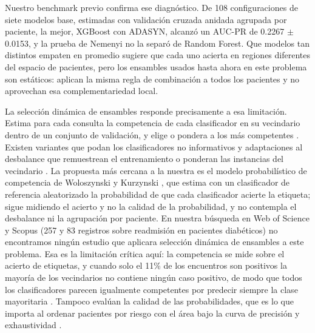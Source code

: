 \documentclass[pdflatex,sn-mathphys-num]{sn-jnl}
\begin{document}
Nuestro benchmark previo confirma ese diagnóstico. De 108 configuraciones de siete modelos base, estimadas con validación cruzada anidada agrupada por paciente, la mejor, XGBoost \cite{bib_chen} con ADASYN, alcanzó un AUC-PR de 0.2267 $\pm$ 0.0153, y la prueba de Nemenyi \cite{bib_demsar} no la separó de Random Forest. Que modelos tan distintos empaten en promedio sugiere que cada uno acierta en regiones diferentes del espacio de pacientes, pero los ensambles usados hasta ahora en este problema son estáticos: aplican la misma regla de combinación a todos los pacientes y no aprovechan esa complementariedad local.

La selección dinámica de ensambles responde precisamente a esa limitación. Estima para cada consulta la competencia de cada clasificador en su vecindario dentro de un conjunto de validación, y elige o pondera a los más competentes \cite{bib_woods_1997, bib_ko_2008, bib_cruz_2018}. Existen variantes que podan los clasificadores no informativos \cite{bib_cruz_2019} y adaptaciones al desbalance que remuestrean el entrenamiento o ponderan las instancias del vecindario \cite{bib_garcia_2018, bib_hou_2020}. La propuesta más cercana a la nuestra es el modelo probabilístico de competencia de Woloszynski y Kurzynski \cite{bib_woloszynski_2011}, que estima con un clasificador de referencia aleatorizado la probabilidad de que cada clasificador acierte la etiqueta; sigue midiendo el acierto y no la calidad de la probabilidad, y no contempla el desbalance ni la agrupación por paciente. En nuestra búsqueda en Web of Science y Scopus (257 y 83 registros sobre readmisión en pacientes diabéticos) no encontramos ningún estudio que aplicara selección dinámica de ensambles a este problema. Esa es la limitación crítica aquí: la competencia se mide sobre el acierto de etiquetas, y cuando solo el 11\% de los encuentros son positivos la mayoría de los vecindarios no contiene ningún caso positivo, de modo que todos los clasificadores parecen igualmente competentes por predecir siempre la clase mayoritaria \cite{bib_cruz_2019}. Tampoco evalúan la calidad de las probabilidades, que es lo que importa al ordenar pacientes por riesgo con el área bajo la curva de precisión y exhaustividad \cite{bib_saito}.
\end{document}
